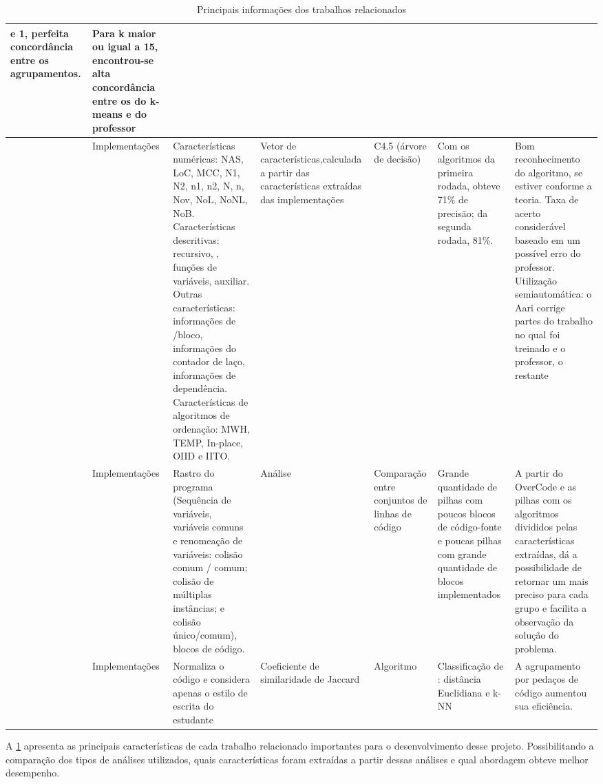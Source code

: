 \begin{landscape}
\begin{table}[h]
\begin{tabularx}{\linewidth}{ |X|X|X|X|X|X|X| }
					e 1, perfeita concordância entre os agrupamentos.
					& Para k maior ou igual a 15, encontrou-se alta concordância entre os
					\foreign{cluster} do k-means e do professor \\
					\hline %
					\citeonline{Taherkhani:2012}
					& Implementações
					& Características numéricas: NAS, LoC, MCC, N1, N2, n1, n2, N, n, Nov,
					NoL, NoNL, NoB. Características descritivas: recursivo, \foreign{tail
					recursive}, funções de variáveis, \foreign{array} auxiliar. Outras
					características: informações de \foreign{loop}/bloco, informações do
					contador de laço, informações de dependência. Características de algoritmos
					de ordenação: MWH, TEMP, In-place, OIID e IITO.
					& Vetor de características,calculada a partir das características extraídas
					das implementações
					& C4.5 (árvore de decisão)
					& Com os algoritmos da primeira rodada, obteve 71\% de precisão; da
					segunda rodada, 81\%.
					& Bom reconhecimento do algoritmo, se estiver conforme a teoria. Taxa de
					acerto considerável baseado em um possível erro do professor. Utilização
					semiautomática: o Aari corrige partes do trabalho no qual foi treinado e
					o professor, o restante \\
					\hline %
					\citeonline{Glassman:2015}
					& Implementações
					& Rastro do programa (Sequência de variáveis, variáveis comuns e
					renomeação de variáveis: colisão comum / comum; colisão de múltiplas
					instâncias; e colisão único/comum), blocos de código.
					& Análise \foreign{pipeline}
					& Comparação entre conjuntos de linhas de código
					& Grande quantidade de pilhas com poucos blocos de código-fonte e poucas
					pilhas com grande quantidade de blocos implementados
					& A partir do OverCode e as pilhas com os algoritmos divididos pelas
					características extraídas, dá a possibilidade de retornar um
					\foreign{feedback} mais preciso para cada grupo e facilita a observação
					da solução do problema. \\
					\hline %
					\citeonline{Wei2015}
					& Implementações
					& Normaliza o código e considera apenas o estilo de escrita do estudante
					& Coeficiente de similaridade de Jaccard
					& Algoritmo \foreign{Winnowing}
					& Classificação de \foreign{workload}: distância Euclidiana e k-NN
					& A agrupamento por pedaços de código aumentou sua eficiência. \\
					\hline
				\end{tabularx}
				\captionsetup{justification=centering}
				\caption{Principais informações dos trabalhos relacionados}
				\label{tab:caracPrinc}
			\end{table}
		\end{landscape}
		
		A \cref{tab:caracPrinc} apresenta as principais características de cada trabalho
		relacionado importantes para o desenvolvimento desse projeto. Possibilitando a
		comparação dos tipos de análises utilizados, quais características foram
		extraídas a partir dessas análises e qual abordagem obteve melhor desempenho. 